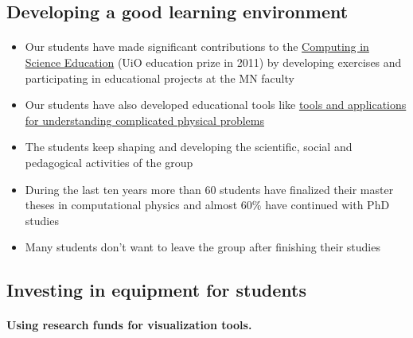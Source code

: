 \documentclass[%
oneside,                 %
final,                   %
10pt]{article}
\begin{document}
\noindent




\subsection{Developing a good learning environment}

\paragraph{}
\begin{itemize}
\item Our students have made significant contributions to  the \href{{http://www.mn.uio.no/english/about/collaboration/cse/}}{Computing in Science Education}  (UiO education prize in 2011) by developing exercises and participating in educational projects at the MN faculty

\item Our students have also developed educational tools like \href{{http://www.mn.uio.no/fysikk/om/aktuelt/aktuelle-saker/2015/realfagsapper.html}}{tools and applications for understanding complicated physical problems} 

\item The students keep shaping and developing the scientific, social and pedagogical activities of the group

\item During the last ten years more than 60 students have finalized their master theses in computational physics and  almost 60\% have continued with PhD studies

\item Many students don't want to leave the group after finishing their studies
\end{itemize}

\noindent






\subsection{Investing in equipment for students}

\paragraph{Using research funds for visualization tools.}
\end{document}
